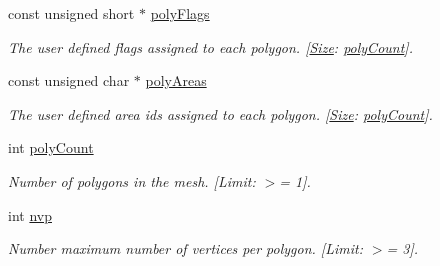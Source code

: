 \begin{Indent}
\begin{DoxyCompactItemize}
\mbox{\label{structdtNavMeshCreateParams_a27e7ff19d77d4b2c9cad3fa85c2b23d2}} 
const unsigned short $\ast$ \hyperlink{structdtNavMeshCreateParams_a27e7ff19d77d4b2c9cad3fa85c2b23d2}{poly\+Flags}
\begin{DoxyCompactList}\small\item\em The user defined flags assigned to each polygon. \mbox{[}\hyperlink{classSize}{Size}\+: \hyperlink{structdtNavMeshCreateParams_ade05d506a6505335142d06f18a35cc45}{poly\+Count}\mbox{]}. \end{DoxyCompactList}\item 
\mbox{\label{structdtNavMeshCreateParams_a683bd022ce69bde61fa686cfc0a6f2f5}} 
const unsigned char $\ast$ \hyperlink{structdtNavMeshCreateParams_a683bd022ce69bde61fa686cfc0a6f2f5}{poly\+Areas}
\begin{DoxyCompactList}\small\item\em The user defined area ids assigned to each polygon. \mbox{[}\hyperlink{classSize}{Size}\+: \hyperlink{structdtNavMeshCreateParams_ade05d506a6505335142d06f18a35cc45}{poly\+Count}\mbox{]}. \end{DoxyCompactList}\item 
\mbox{\label{structdtNavMeshCreateParams_ade05d506a6505335142d06f18a35cc45}} 
int \hyperlink{structdtNavMeshCreateParams_ade05d506a6505335142d06f18a35cc45}{poly\+Count}
\begin{DoxyCompactList}\small\item\em Number of polygons in the mesh. \mbox{[}Limit\+: $>$= 1\mbox{]}. \end{DoxyCompactList}\item 
\mbox{\label{structdtNavMeshCreateParams_aa0cacf292dd206fe7da335461c3af65c}} 
int \hyperlink{structdtNavMeshCreateParams_aa0cacf292dd206fe7da335461c3af65c}{nvp}
\begin{DoxyCompactList}\small\item\em Number maximum number of vertices per polygon. \mbox{[}Limit\+: $>$= 3\mbox{]}. \end{DoxyCompactList}\end{DoxyCompactItemize}
\end{Indent}
